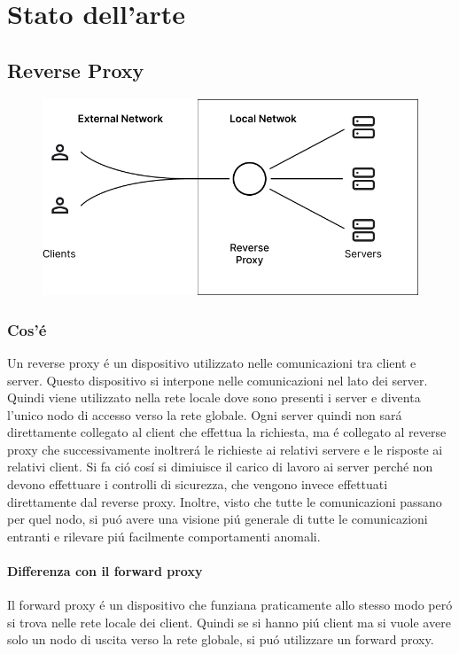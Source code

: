 \chapter{Stato dell'arte}
\label{cha:statoArte}

\section{Reverse Proxy}
\begin{figure}[h!]
  \centering
  \includegraphics[width=.6\textwidth]{images/schema.png}
\end{figure}

\subsection{Cos'é}
Un reverse proxy é un dispositivo utilizzato nelle comunicazioni tra client e server. Questo dispositivo si interpone nelle comunicazioni nel lato dei server. Quindi viene utilizzato nella rete locale dove sono presenti i server e diventa l'unico nodo di accesso verso la rete globale. Ogni server quindi non sará direttamente collegato al client che effettua la richiesta, ma é collegato al reverse proxy che successivamente inoltrerá le richieste ai relativi servere e le risposte ai relativi client. Si fa ció cosí si dimiuisce il carico di lavoro ai server perché non devono effettuare i controlli di sicurezza, che vengono invece effettuati direttamente dal reverse proxy. Inoltre, visto che tutte le comunicazioni passano per quel nodo, si puó avere una visione piú generale di tutte le comunicazioni entranti e rilevare piú facilmente comportamenti anomali.
\subsubsection{Differenza con il forward proxy}
Il forward proxy é un dispositivo che funziana praticamente allo stesso modo peró si trova nelle rete locale dei client. Quindi se si hanno piú client ma si vuole avere solo un nodo di uscita verso la rete globale, si puó utilizzare un forward proxy.

